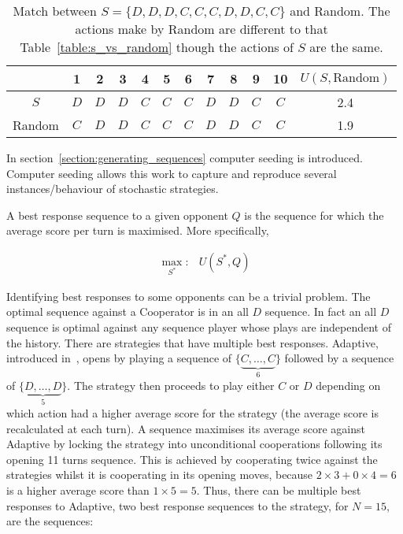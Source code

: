 \begin{table}[htb]
    \centering
    \begin{tabular}{cccccccccccc}
        & \textbf{1} & \textbf{2} & \textbf{3} & \textbf{4}  & \textbf{5} & \textbf{6} & \textbf{7} & \textbf{8}  & \textbf{9} & \textbf{10} &
        \(U(S, \text{Random})\) \\ \midrule
        \(S\) & \(D\) & \(D\) & \(D\) & \(C\) & \(C\) & \(C\) & \(D\) & \(D\) & \(C\) & \(C\) & 2.4 \\
        Random & \(C\) & \(D\) & \(D\) & \(C\) & \(C\) & \(C\) & \(D\) & \(D\) & \(C\) & \(C\) & 1.9 \\ \bottomrule
    \end{tabular}
\caption{Match between \(S = \{D, D, D, C, C, C, D, D, C, C\}\) and Random.
The actions make by Random are different to that Table~\ref{table:s_vs_random} though the
actions of \(S\) are the same.}\label{table:s_vs_random_2}
 \end{table}

In section~\ref{section:generating_sequences} computer seeding is introduced.
Computer seeding allows this work to capture and reproduce several
instances/behaviour of stochastic strategies.

A best response sequence to a given opponent \(Q\) is the sequence for which the
average score per turn is maximised. More specifically,

\begin{equation}\label{eq:best_response}
    \begin{aligned}
    \max_{S^*}: & U(S^*, Q)
    \end{aligned}
\end{equation}

Identifying best responses to some opponents can be a trivial problem. The
optimal sequence against a Cooperator is in an all \(D\) sequence. In fact an
all \(D\) sequence is optimal against any sequence player whose plays are
independent of the history.  %
There are strategies that have multiple best responses.
Adaptive, introduced in~\cite{Li2011}, opens by playing a sequence of \(\{\underbrace{C, \dots, C}_{6}\}\)
followed by a sequence of \(\{\underbrace{D, \dots, D}_{5}\}\). The strategy then proceeds to play
either \(C\) or \(D\) depending on which action had a higher average score for
the strategy (the average score is recalculated at each turn). A sequence
maximises its average score against Adaptive by locking the strategy into
unconditional cooperations following its opening 11 turns sequence. This is
achieved by cooperating twice against the strategies whilst it is cooperating
in its opening moves, because \(2 \times 3 + 0 \times 4 = 6\) is a
higher average score than \(1 \times 5 = 5\). Thus, there can be multiple best
responses to Adaptive, two best response sequences to the strategy, for \(N=15\),
are the sequences:


